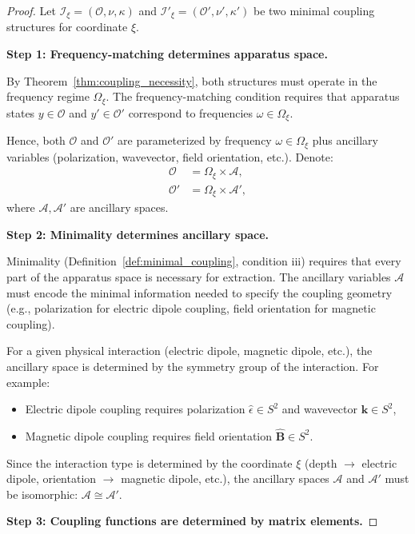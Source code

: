 \documentclass[twocolumn,10pt,a4paper]{article}
\theoremstyle{remark}
\newcommand{\oscillator}{\mathcal{O}}
\begin{document}
\begin{proof}
Let $\mathcal{I}_\xi = (\oscillator, \nu, \kappa)$ and $\mathcal{I}'_\xi = (\oscillator', \nu', \kappa')$ be two minimal coupling structures for coordinate $\xi$.

\textbf{Step 1: Frequency-matching determines apparatus space.}

By Theorem~\ref{thm:coupling_necessity}, both structures must operate in the frequency regime $\Omega_\xi$. The frequency-matching condition requires that apparatus states $y \in \oscillator$ and $y' \in \oscillator'$ correspond to frequencies $\omega \in \Omega_\xi$.

Hence, both $\oscillator$ and $\oscillator'$ are parameterized by frequency $\omega \in \Omega_\xi$ plus ancillary variables (polarization, wavevector, field orientation, etc.). Denote:
\begin{align}
\oscillator &= \Omega_\xi \times \mathcal{A}, \\
\oscillator' &= \Omega_\xi \times \mathcal{A}',
\end{align}
where $\mathcal{A}, \mathcal{A}'$ are ancillary spaces.

\textbf{Step 2: Minimality determines ancillary space.}

Minimality (Definition~\ref{def:minimal_coupling}, condition iii) requires that every part of the apparatus space is necessary for extraction. The ancillary variables $\mathcal{A}$ must encode the minimal information needed to specify the coupling geometry (e.g., polarization for electric dipole coupling, field orientation for magnetic coupling).

For a given physical interaction (electric dipole, magnetic dipole, etc.), the ancillary space is determined by the symmetry group of the interaction. For example:
\begin{itemize}[noitemsep]
    \item Electric dipole coupling requires polarization $\hat{\epsilon} \in S^2$ and wavevector $\mathbf{k} \in S^2$,
    \item Magnetic dipole coupling requires field orientation $\hat{\mathbf{B}} \in S^2$.
\end{itemize}

Since the interaction type is determined by the coordinate $\xi$ (depth $\to$ electric dipole, orientation $\to$ magnetic dipole, etc.), the ancillary spaces $\mathcal{A}$ and $\mathcal{A}'$ must be isomorphic: $\mathcal{A} \cong \mathcal{A}'$.

\textbf{Step 3: Coupling functions are determined by matrix elements.}


\end{proof}
\end{document}
